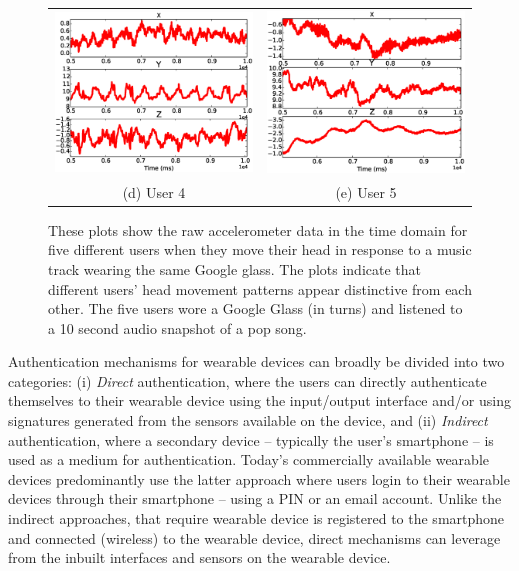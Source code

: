 \begin{figure}[t]
\begin{center}
\begin{tabular}{cc}
\includegraphics [width=.33\linewidth]{fig/raw_sub4.eps}&
\includegraphics [width=.33\linewidth]{fig/raw_sub5.eps}\\
(d) User 4& (e) User 5 \\
\end{tabular}
\end{center}
\caption{\label{fig:raw} These plots show the raw accelerometer data in the
time domain for five different users when they move their head in response to
a music track wearing the same Google glass. The plots
indicate that different users' head movement patterns appear distinctive from
each other. The five users wore a Google Glass (in turns) and listened to a
10 second audio snapshot of a pop song.}
\end{figure}

Authentication mechanisms for wearable devices can broadly be divided into two
categories: (i) {\em Direct} authentication, where the users can directly
authenticate themselves to their wearable device using the input/output
interface and/or using signatures generated from the sensors available on the
device, and (ii) {\em Indirect} authentication, where a secondary device --
typically the user's smartphone -- is used as a medium for authentication.
Today's commercially available wearable devices predominantly use the latter
approach where users login to their wearable devices through their smartphone
-- using a PIN or an email account.
Unlike the indirect approaches, that require wearable device is registered to
the smartphone and connected (wireless) to the wearable device, direct
mechanisms can leverage from the inbuilt interfaces and sensors on the
wearable device.

